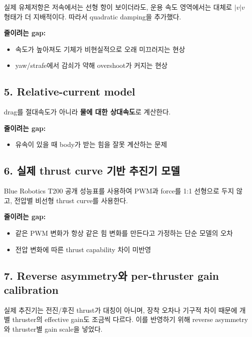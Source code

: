\documentclass[11pt,a4paper]{article}
\begin{document}
실제 유체저항은 저속에서는 선형 항이 보이더라도, 운용 속도 영역에서는 대체로 $|v|v$ 형태가 더 지배적이다. 따라서 quadratic damping을 추가했다.

\textbf{줄이려는 gap:}

\begin{itemize}[leftmargin=2em]
  \item 속도가 높아져도 기체가 비현실적으로 오래 미끄러지는 현상
  \item yaw/strafe에서 감쇠가 약해 overshoot가 커지는 현상
\end{itemize}

\subsection{5. Relative-current model}

drag를 절대속도가 아니라 \textbf{물에 대한 상대속도}로 계산한다.

\textbf{줄이려는 gap:}

\begin{itemize}[leftmargin=2em]
  \item 유속이 있을 때 body가 받는 힘을 잘못 계산하는 문제
\end{itemize}

\subsection{6. 실제 thrust curve 기반 추진기 모델}

Blue Robotics T200 공개 성능표를 사용하여 PWM과 force를 1:1 선형으로 두지 않고, 전압별 비선형 thrust curve를 사용한다.

\textbf{줄이려는 gap:}

\begin{itemize}[leftmargin=2em]
  \item 같은 PWM 변화가 항상 같은 힘 변화를 만든다고 가정하는 단순 모델의 오차
  \item 전압 변화에 따른 thrust capability 차이 미반영
\end{itemize}

\subsection{7. Reverse asymmetry와 per-thruster gain calibration}

실제 추진기는 전진/후진 thrust가 대칭이 아니며, 장착 오차나 기구적 차이 때문에 개별 thruster의 effective gain도 조금씩 다르다. 이를 반영하기 위해 reverse asymmetry와 thruster별 gain scale을 넣었다.
\end{document}
